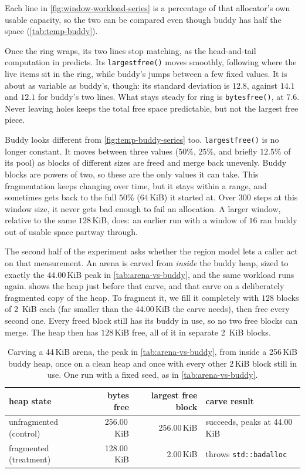 \documentclass[12pt]{report}
\newcommand{\fullref}[1]{\Cref{#1}}
\renewcommand{\_}{\origunderscore\allowbreak}
\begin{document}


Each line in \cref{fig:window-workload-series} is a percentage of that allocator's own usable capacity, so the two can be compared even though buddy has half the space (\cref{tab:temp-buddy}).

Once the ring wraps, its two lines stop matching, as the head-and-tail computation in \fullref{sec:allocator-integration} predicts. Its \texttt{largest\_free()} moves smoothly, following where the live items sit in the ring, while buddy's jumps between a few fixed values. It is about as variable as buddy's, though: its standard deviation is $12.8$, against $14.1$ and $12.1$ for buddy's two lines. What stays steady for ring is \texttt{bytes\_free()}, at $7.6$. Never leaving holes keeps the total free space predictable, but not the largest free piece.

Buddy looks different from \cref{fig:temp-buddy-series} too. \texttt{largest\_free()} is no longer constant. It moves between three values ($50\%$, $25\%$, and briefly $12.5\%$ of its pool) as blocks of different sizes are freed and merge back unevenly. Buddy blocks are powers of two, so these are the only values it can take. This fragmentation keeps changing over time, but it stays within a range, and sometimes gets back to the full $50\%$ ($64$\,KiB) it started at. Over $300$ steps at this window size, it never gets bad enough to fail an allocation. A larger window, relative to the same $128$\,KiB, does: an earlier run with a window of $16$ ran buddy out of usable space partway through.

The second half of the experiment asks whether the region model lets a caller act on that measurement. An arena is carved from \emph{inside} the buddy heap, sized to exactly the $44.00$\,KiB peak in \cref{tab:arena-vs-buddy}, and the same workload runs again.  shows the heap just before that carve, and that carve on a deliberately fragmented copy of the heap. To fragment it, we fill it completely with $128$ blocks of 2~KiB each (far smaller than the $44.00$\,KiB the carve needs), then free every second one. Every freed block still has its buddy in use, so no two free blocks can merge. The heap then has $128$\,KiB free, all of it in separate 2~KiB blocks.

\begin{table}[h]
  \centering
  \caption{Carving a 44\,KiB arena, the peak in \cref{tab:arena-vs-buddy}, from inside a 256\,KiB buddy heap, once on a clean heap and once with every other 2\,KiB block still in use. One run with a fixed seed, as in \cref{tab:arena-vs-buddy}.}
  \label{tab:arena-fragmentation}
  \begin{tabular}{lrr>{\raggedright\arraybackslash}p{3.4cm}}
    \toprule
    heap state & bytes free & largest free block & carve result \\
    \midrule
    unfragmented (control) & 256.00\,KiB & 256.00\,KiB & succeeds, peaks at 44.00\,KiB \\
    fragmented (treatment) & 128.00\,KiB & 2.00\,KiB & throws \texttt{std::bad\_alloc} \\
    \bottomrule
  \end{tabular}
\end{table}
\end{document}
